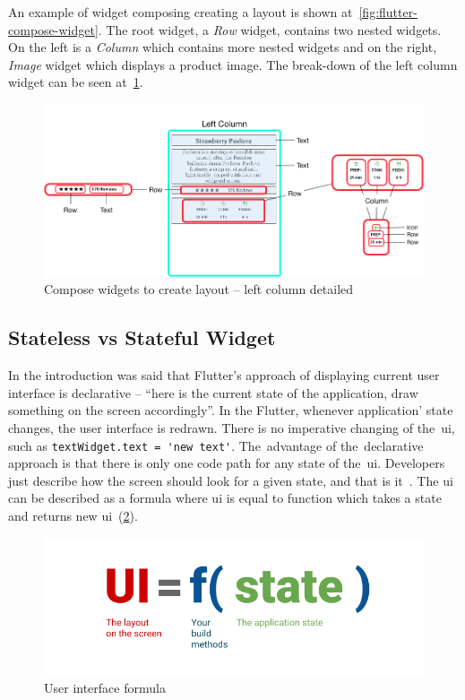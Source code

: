 An example of widget composing creating a layout is shown at~\cref{fig:flutter-compose-widget}. The root widget, a \textit{Row} widget, contains two nested widgets. On the left is a \textit{Column} which contains more nested widgets and on the right, \textit{Image} widget which displays a product image.  The break-down of the left column widget can be seen at~\cref{fig:flutter-compose-widget-detail}. 

\begin{figure}[htp]
    \centering
    \includegraphics[width=0.75\linewidth]{img/flutter/layout_compose_detail.png}
    \caption{Compose widgets to create layout -- left column detailed~\cite{flutter-widget-layout}}
    \label{fig:flutter-compose-widget-detail}
\end{figure}
\subsection{Stateless vs Stateful Widget}
In the introduction was said that Flutter's approach of displaying current user interface is declarative -- ``here is the current state of the application, draw something on the screen accordingly''.  In the Flutter, whenever application' state changes, the user interface is redrawn. There is no imperative changing of the~\gls{ui}, such as \verb|textWidget.text = 'new text'|. The~advantage of the~declarative approach is that there is only one code path for any state of the~\gls{ui}. Developers just describe how the screen should look for a given state, and that is it~\cite{flutter-declarative}. The \gls{ui} can be described as a formula where \gls{ui} is equal to function which takes a state and returns new \gls{ui}~(\cref{fig:flutter-ui-formula}).

\begin{figure}[htp]
    \centering
    \includegraphics[width=0.6\linewidth]{img/flutter/ui_f_state.png}
    \caption{User interface formula~\cite{flutter-declarative}}
    \label{fig:flutter-ui-formula}
\end{figure}
